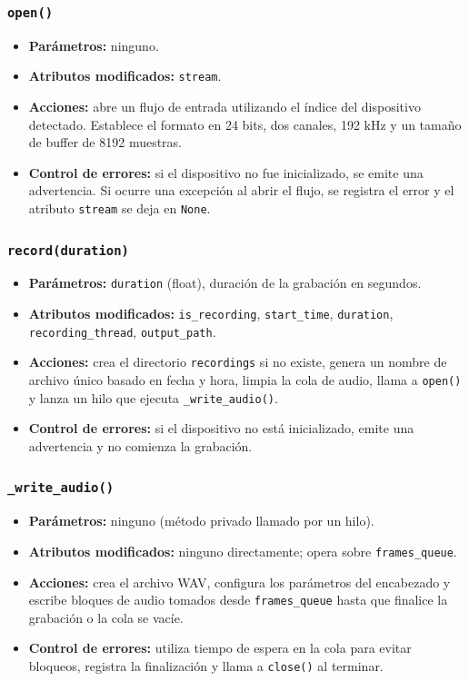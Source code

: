 \subsubsection*{\texttt{open()}}

\begin{itemize}
    \item \textbf{Parámetros:} ninguno.
    \item \textbf{Atributos modificados:} \texttt{stream}.
    \item \textbf{Acciones:} abre un flujo de entrada utilizando el índice del dispositivo detectado. Establece el formato en 24 bits, dos canales, 192 kHz y un tamaño de buffer de 8192 muestras.
    \item \textbf{Control de errores:} si el dispositivo no fue inicializado, se emite una advertencia. Si ocurre una excepción al abrir el flujo, se registra el error y el atributo \texttt{stream} se deja en \texttt{None}.
\end{itemize}

\subsubsection*{\texttt{record(duration)}}

\begin{itemize}
    \item \textbf{Parámetros:} \texttt{duration} (float), duración de la grabación en segundos.
    \item \textbf{Atributos modificados:} \texttt{is\_recording}, \texttt{start\_time}, \texttt{duration}, \texttt{recording\_thread}, \texttt{output\_path}.
    \item \textbf{Acciones:} crea el directorio \texttt{recordings} si no existe, genera un nombre de archivo único basado en fecha y hora, limpia la cola de audio, llama a \texttt{open()} y lanza un hilo que ejecuta \texttt{\_write\_audio()}.
    \item \textbf{Control de errores:} si el dispositivo no está inicializado, emite una advertencia y no comienza la grabación.
\end{itemize}

\subsubsection*{\texttt{\_write\_audio()}}

\begin{itemize}
    \item \textbf{Parámetros:} ninguno (método privado llamado por un hilo).
    \item \textbf{Atributos modificados:} ninguno directamente; opera sobre \texttt{frames\_queue}.
    \item \textbf{Acciones:} crea el archivo WAV, configura los parámetros del encabezado y escribe bloques de audio tomados desde \texttt{frames\_queue} hasta que finalice la grabación o la cola se vacíe.
    \item \textbf{Control de errores:} utiliza tiempo de espera en la cola para evitar bloqueos, registra la finalización y llama a \texttt{close()} al terminar.
\end{itemize}

